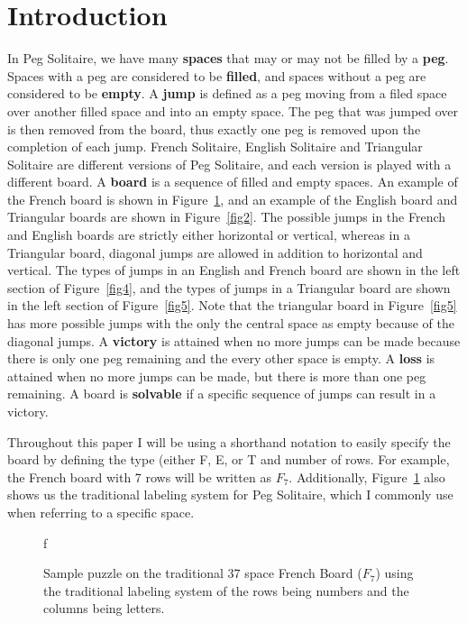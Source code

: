 \documentclass{article}
\begin{document}
\section{Introduction}
In Peg Solitaire, we have many \textbf{spaces} that may or may not be filled by a \textbf{peg}. Spaces with a peg are considered to be \textbf{filled}, and spaces without a peg are considered to be \textbf{empty}. A \textbf{jump} is defined as a peg moving from a filed space over another filled space and into an empty space. The peg that was jumped over is then removed from the board, thus exactly one peg is removed upon the completion of each jump. French Solitaire, English Solitaire and Triangular Solitaire are different versions of Peg Solitaire, and each version is played with a different board. A \textbf{board} is a sequence of filled and empty spaces. An example of the French board is shown in Figure~\ref{fig1}, and an example of the English board and Triangular boards are shown in Figure~\ref{fig2}. The possible jumps in the French and English boards are strictly either horizontal or vertical, whereas in a Triangular board, diagonal jumps are allowed in addition to horizontal and vertical. The types of jumps in an English and French board are shown in the left section of Figure~\ref{fig4}, and the types of jumps in a Triangular board are shown in the left section of Figure~\ref{fig5}. Note that the triangular board in Figure~\ref{fig5} has more possible jumps with the only the central space as empty because of the diagonal jumps. A \textbf{victory} is attained when no more jumps can be made because there is only one peg remaining and the every other space is empty. A \textbf{loss} is attained when no more jumps can be made, but there is more than one peg remaining. A board is \textbf{solvable} if a specific sequence of jumps can result in a victory.

Throughout this paper I will be using a shorthand notation to easily specify the board by defining the type (either F, E, or T and number of rows. For example, the French board with 7 rows will be written as $F_7$. Additionally, Figure~\ref{fig1} also shows us the traditional labeling system for Peg Solitaire, which I commonly use when referring to a specific space.

\begin{figure}[htb]
\centering
f
\caption{Sample puzzle on the traditional 37 space French Board ($F_7$) using the traditional labeling system of the rows being numbers and the columns being letters.}
\label{fig1}
\end{figure}
\end{document}
